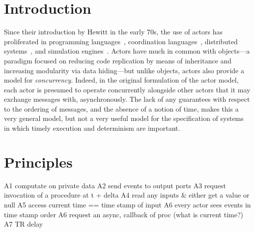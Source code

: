 \documentclass[sigconf]{acmart}
\begin{document}

%




\maketitle 


\section{Introduction}\label{sec:intro}
Since their introduction by Hewitt in the early 70s, the use of actors has proliferated 
in programming languages~\cite{Armstrong:96:Erlang,haller2009scala,desai2013p}, coordination languages~\cite{Arbab:04:Reo,ARC}, distributed systems~\cite{Hunt2018, DBLP:journals/corr/abs-1712-05889}, and simulation engines~\cite{Ptolemy:14:Book,DBLP:journals/fuin/SirjaniMSB04}.
Actors have much in common with objects---a paradigm focused on reducing code replication 
by means of inheritance and increasing modularity via data hiding---but unlike %
objects, actors also provide a model for \emph{concurrency}.
Indeed, in the original formulation of the actor model, each actor is presumed to operate concurrently alongside
other actors that it may exchange messages with, asynchronously. The lack of any guarantees
with respect to the ordering of messages, and the absence of a notion of time, makes this a
very general model, but not a very useful model for the specification of systems in which
timely execution and determinism are important. 

\section{Principles}

A1 computate on private data
A2 send events to output ports
A3 request invocation of a procedure at t + delta
A4 read any inputs \& either get a value or null
A5 access current time == time stamp of input
A6 every actor sees events in time stamp order
A6 request an async, callback of proc (what is current time?)
A7 TR delay
\end{document}
